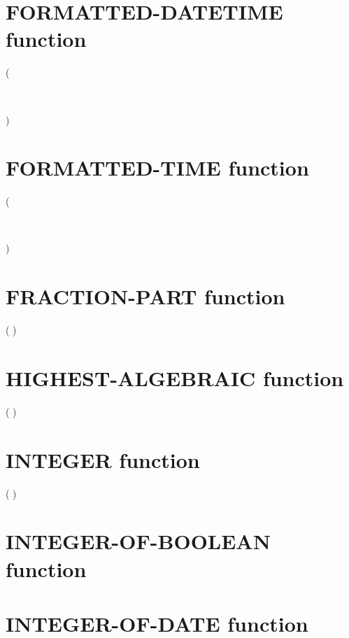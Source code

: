 \section{FORMATTED-DATETIME function}

 

( \argument \argument \argument
\begin{0-1}
  \argument \\
\end{0-1}
)

\section{FORMATTED-TIME function}

  ( \argument \argument
\begin{0-1}
  \argument \\
\end{0-1}
)

\section{FRACTION-PART function}

  ( \argument )

\section{HIGHEST-ALGEBRAIC function}

  ( \argument )

\section{INTEGER function}

  ( \argument )

\section{INTEGER-OF-BOOLEAN function}


\section{INTEGER-OF-DATE function}

